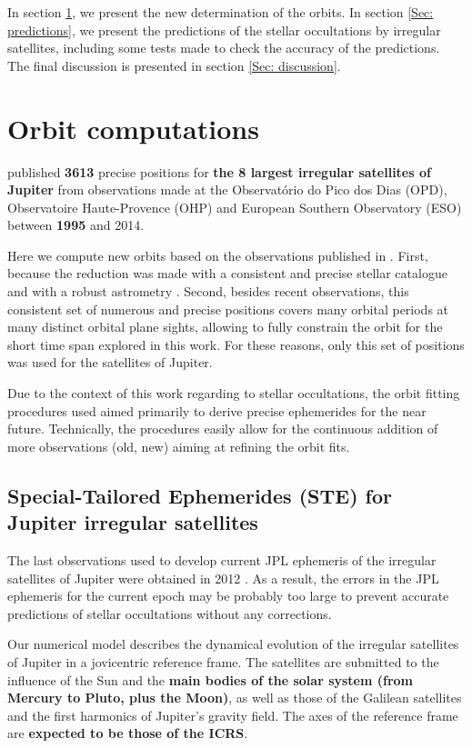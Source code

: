 \documentclass[useAMS,usenatbib]{mn2e}
\begin{document}
In section \ref{Sec: integration}, we present the new determination of the orbits. In section \ref{Sec: predictions}, we present the predictions of the stellar occultations by irregular satellites, including some tests made to check the accuracy of the predictions. The final discussion is presented in section \ref{Sec: discussion}.

\section{Orbit computations} \label{Sec: integration}

 published \textbf{3613} precise positions for \textbf{the 8 largest irregular satellites of Jupiter} from observations made at the Observatório do Pico dos Dias (OPD), Observatoire Haute-Provence (OHP) and European Southern Observatory (ESO) between \textbf{1995} and 2014. 

Here we compute new orbits based on the observations published in . First, because the reduction was made with a consistent and precise stellar catalogue and with a robust astrometry \citep[PRAIA,][]{Assafin2011}. Second, besides recent observations, this consistent set of numerous and precise positions covers many orbital periods at many distinct orbital plane sights, allowing to fully constrain the orbit for the short time span explored in this work. For these reasons, only this set of positions was used for the satellites of Jupiter.

Due to the context of this work regarding to stellar occultations, the orbit fitting procedures used aimed primarily to derive precise ephemerides for the near future. Technically, the procedures easily allow for the continuous addition of more observations (old, new) aiming at refining the orbit fits.

\subsection{Special-Tailored Ephemerides (STE) for Jupiter irregular satellites}

The last observations used to develop current JPL ephemeris of the irregular satellites of Jupiter were obtained in 2012 \citep{Jacobson2012}. As a result, the errors in the JPL ephemeris for the current epoch may be probably too large to prevent accurate predictions of stellar occultations without any corrections.

Our numerical model describes the dynamical evolution of the irregular satellites of Jupiter in a jovicentric reference frame. The satellites are submitted to the influence of the Sun and the \textbf{main bodies of the solar system (from Mercury to Pluto, plus the Moon)}, as well as those of the Galilean satellites and the first harmonics of Jupiter's gravity field. The axes of the reference frame are \textbf{expected to be those of the ICRS}.
\end{document}
